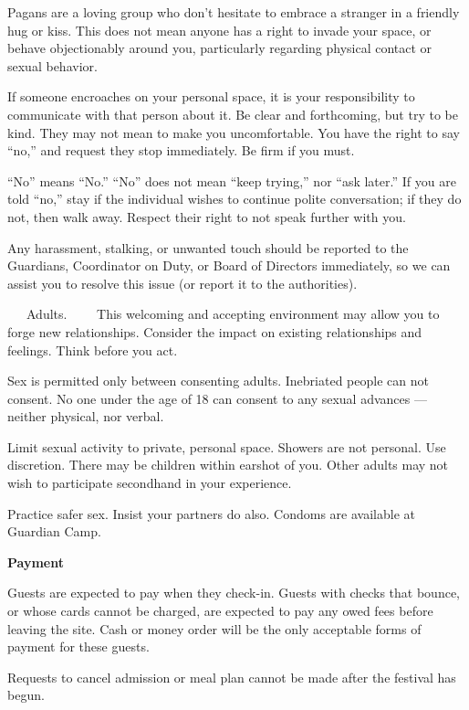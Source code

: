 \documentclass[9pt,twoside,openright,final,article]{memoir}
\renewcommand{\subsection}[1]{%
  \vspace{6pt}%
  \needspace{1.25in}%
  \begin{center}\textbf{\Large \beltanefamily #1}\end{center}

  \nopagebreak}
\renewcommand{\subsubsection}[1]{%
  \vspace{1pt}\needspace{1.5in}
  {\large ~~~\beltanefamily #1~~~\ }
  \nopagebreak}
\begin{document}
\begin{multicols}{2}
  Pagans are a loving group who don’t hesitate to embrace a stranger
  in a friendly hug or kiss.  This does not mean anyone has a right to
  invade your space, or behave objectionably around you, particularly
  regarding physical contact or sexual behavior.

  If someone encroaches on your personal space, it is your
  responsibility to communicate with that person about it. Be clear
  and forthcoming, but try to be kind. They may not mean to make you
  uncomfortable. You have the right to say ``no,'' and request they stop
  immediately.  Be firm if you must.

  ``No'' means ``No.'' ``No'' does not mean ``keep trying,'' nor ``ask later.''
  If you are told ``no,'' stay if the individual wishes to continue
  polite conversation; if they do not, then walk away. Respect their
  right to not speak further with you.

  Any harassment, stalking, or unwanted touch should be reported to
  the Guardians, Coordinator on Duty, or Board of Directors
  immediately, so we can assist you to resolve this issue (or report
  it to the authorities).


  \subsubsection{Adults.} This welcoming and accepting environment may
  allow you to forge new relationships. Consider the impact on
  existing relationships and feelings. Think before you act.

  Sex is permitted only between consenting adults. Inebriated people
  can not consent. No one under the age of 18 can consent to any
  sexual advances — neither physical, nor verbal.

  Limit sexual activity to private, personal space. Showers are not
  personal. Use discretion.  There may be children within earshot of
  you. Other adults may not wish to participate secondhand in your
  experience.

  Practice safer sex. Insist your partners do also.  Condoms are
  available at Guardian Camp.

  \subsection{Payment}

  Guests are expected to pay when they check-in. Guests with checks
  that bounce, or whose cards cannot be charged, are expected to pay
  any owed fees before leaving the site. Cash or money order will be
  the only acceptable forms of payment for these guests.

  Requests to cancel admission or meal plan cannot be made after the
  festival has begun.

\end{multicols}
\end{document}
